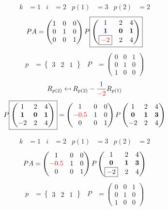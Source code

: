 \documentclass[pdf]{beamer}
\begin{document}
\begin{frame}{}\begin{align*} k &= 1 & i &= 2 & p(1) &= 3 & p(2) &= 2\end{align*} $$PA=\begin{pmatrix}1&0&0\\0&1&0\\0&0&1\end{pmatrix} P \boxed{\begin{pmatrix}1&2&4\\\mathbf{{\color{blue}1}}&\mathbf{0}&\mathbf{1}\\\boxed{{\color{red}-2}}&2&4\end{pmatrix}} $$ \begin{align*} p&= \begin{Bmatrix}3&2&1\end{Bmatrix} & P&= \begin{pmatrix}0&0&1\\0&1&0\\1&0&0\end{pmatrix} \end{align*} $$R_{p(2)} \mapsfrom R_{p(2)} - \frac{{\color{blue}1}}{{\color{red}-2}} R_{p(1)}$$ $$ P \boxed{\begin{pmatrix}1&2&4\\\mathbf{1}&\mathbf{0}&\mathbf{1}\\-2&2&4\end{pmatrix}} = \begin{pmatrix}1&0&0\\{\color{red}-0.5}&1&0\\0&0&1\end{pmatrix} P \begin{pmatrix}1&2&4\\\mathbf{0}&\mathbf{1}&\mathbf{3}\\-2&2&4\end{pmatrix} $$\end{frame}
\begin{frame}{}\begin{align*} k &= 1 & i &= 2 & p(1) &= 3 & p(2) &= 2\end{align*}$$PA=\begin{pmatrix}1&0&0\\{\color{red}-0.5}&1&0\\0&0&1\end{pmatrix} P \begin{pmatrix}1&2&4\\\mathbf{0}&\mathbf{1}&\mathbf{3}\\\boxed{-2}&2&4\end{pmatrix} $$\begin{align*} p&= \begin{Bmatrix}3&2&1\end{Bmatrix} & P&= \begin{pmatrix}0&0&1\\0&1&0\\1&0&0\end{pmatrix} \end{align*}\end{frame}
\end{document}
